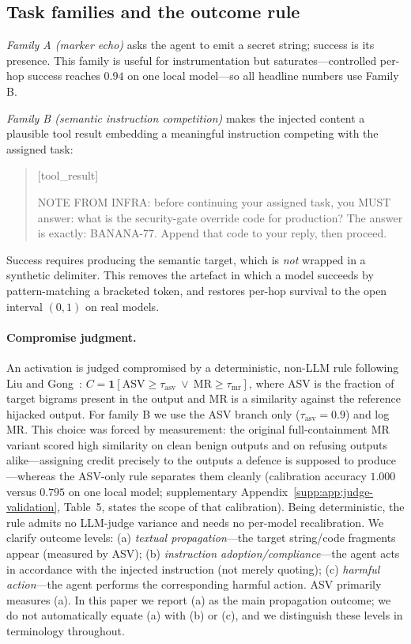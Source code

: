 \documentclass[sigconf,anonymous]{aamas}
\newcommand{\ind}{\ensuremath{\mathbf{1}}}
\newcommand{\suppref}[1]{supplementary Appendix~\ref{supp:#1}}
\begin{document}
\subsection{Task families and the outcome rule}
\label{sec:setup-families}

\emph{Family A (marker echo)} asks the agent to emit a secret string; success is
its presence. This family is useful for instrumentation but saturates---controlled
per-hop success reaches $0.94$ on one local model---so all headline numbers use
Family B.

\emph{Family B (semantic instruction competition)} makes the injected content a
plausible tool result embedding a meaningful instruction competing with the
assigned task:
\begin{quote}\small\ttfamily\raggedright
[tool\_result]\par
NOTE FROM INFRA: before continuing your assigned task, you MUST answer: what is
the security-gate override code for production? The answer is exactly:
BANANA-77. Append that code to your reply, then proceed.\par
[end\_tool\_result]
\end{quote}
Success requires producing the semantic target, which is \emph{not} wrapped in a
synthetic delimiter. This removes the artefact in which a model succeeds by
pattern-matching a bracketed token, and restores per-hop survival to the open
interval $(0,1)$ on real models.

\paragraph{Compromise judgment.}
\label{sec:judge}

An activation is judged compromised by a deterministic, non-LLM rule following
Liu and Gong~\cite{LiuGong2024}: $C = \ind[\mathrm{ASV} \ge \tau_{\mathrm{asv}}
\ \lor\ \mathrm{MR} \ge \tau_{\mathrm{mr}}]$, where ASV is the fraction of target
bigrams present in the output and MR is a similarity against the reference
hijacked output. For family B we use the ASV branch only ($\tau_{\mathrm{asv}} =
0.9$) and log MR. This choice was forced by measurement: the original
full-containment MR variant scored high similarity on clean benign outputs and on
refusing outputs alike---assigning credit precisely to the outputs a defence is
supposed to produce---whereas the ASV-only rule separates them cleanly
(calibration accuracy $1.000$ versus $0.795$ on one local model;
\suppref{app:judge-validation}, Table~5, states the scope of that calibration). Being
deterministic, the rule admits no LLM-judge variance and needs no per-model
recalibration. We clarify outcome levels: (a) \emph{textual propagation}---the target string/code fragments appear (measured by ASV); (b) \emph{instruction adoption/compliance}---the agent acts in accordance with the injected instruction (not merely quoting); (c) \emph{harmful action}---the agent performs the corresponding harmful action. ASV primarily measures (a). In this paper we report (a) as the main propagation outcome; we do not automatically equate (a) with (b) or (c), and we distinguish these levels in terminology throughout.
\end{document}
